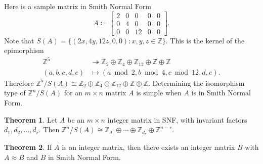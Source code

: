 \documentclass[12pt,a4paper]{article}
\newcommand{\Z}{\mathbb{Z}}
\theoremstyle{definition}
\newtheorem{theorem}{Theorem}[section]
\begin{document}
Here is a sample matrix in Smith Normal Form
\[ A \coloneqq
  \begin{bmatrix}
    2 & 0 & 0 & 0 & 0 \\
    0 & 4 & 0 & 0 & 0 \\
    0 & 0 & 12 & 0 & 0
  \end{bmatrix}.
\]
Note that $S(A)=\{(2x,4y,12z,0,0) : x,y,z\in\Z\}$. This is the kernel of the epimorphism
\begin{align*}
  \Z^5 &\twoheadrightarrow \Z_2\oplus\Z_4\oplus\Z_{12}\oplus\Z\oplus\Z \\
  (a,b,c,d,e) &\mapsto (a\bmod 2, b\bmod 4, c\bmod 12, d, e).
\end{align*}
Therefore $\Z^5/S(A)\cong\Z_2\oplus\Z_4\oplus\Z_{12}\oplus\Z\oplus\Z$. Determining the isomorphism type of $\Z^n/S(A)$ for an $m\times n$ matrix $A$ is simple when $A$ is in Smith Normal Form.

\begin{theorem}
  Let $A$ be an $m\times n$ integer matrix in SNF, with invariant factors $d_1,d_2,\ldots,d_r$. Then $\Z^n/S(A)\cong\Z_{d_1}\oplus\cdots\oplus\Z_{d_r}\oplus\Z^{n-r}$.
\end{theorem}

\begin{theorem}
  \label{SNF-existence}
  If $A$ is an integer matrix, then there exists an integer matrix $B$ with $A\approx B$ and $B$ in Smith Normal Form.
\end{theorem}
\end{document}
